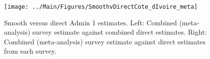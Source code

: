 \documentclass[12pt]{article}\usepackage[]{graphicx}\usepackage[]{color}
\newenvironment{knitrout}{}{} %
\begin{document}



\begin{knitrout}
\color{fgcolor}\begin{figure}[bht]

{\centering \texttt{[image: ../Main/Figures/SmoothvDirectCote\_dIvoire\_meta]} 

}

\caption[Smooth versus direct Admin 1 estimates]{Smooth versus direct Admin 1 estimates. Left: Combined (meta-analysis) survey estimate against combined direct estimates. Right: Combined (meta-analysis) survey estimate against direct estimates from each survey.}\label{fig:unnamed-chunk-83}
\end{figure}


\end{knitrout}
\end{document}
